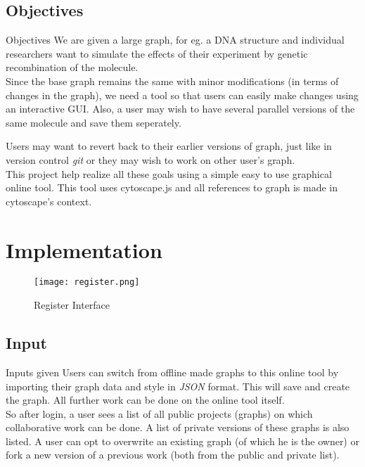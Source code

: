 \documentclass{beamer}
\begin{document}
\subsection{Objectives}
\begin{frame}[allowframebreaks]{Objectives}
We are given a large graph, for eg. a DNA structure and individual researchers want to simulate the effects of their experiment by genetic recombination of the molecule. \\
Since the base graph remains the same with minor modifications (in terms of changes in the graph), we need a tool so that users can easily make changes using an interactive GUI. Also, a user may wish to have several parallel versions of the same molecule and save them seperately. \\
\framebreak

Users may want to revert back to their earlier versions of graph, just like in version control \emph{git} or they may wish to work on other user's graph. \\
This project help realize all these goals using a  simple easy to use graphical online tool. This tool uses cytoscape.js and all references to graph is made in cytoscape's context.
\end{frame}

\section{Implementation}

\begin{frame}
\begin{figure}
\centering
\texttt{[image: register.png]}
\label{fig:register}
\caption{Register Interface}
\end{figure}
\end{frame}

\subsection{Input}
\begin{frame}{Inputs given}
Users can switch from offline made graphs to this online tool by importing their graph data and style in \emph{JSON} format. This will save and create the graph. All further work can be done on the online tool itself.\\
So after login, a user sees a list of all public projects (graphs) on which collaborative work can be done. A list of private versions of these graphs is also listed. A user can opt to overwrite an existing graph (of which he is the owner) or fork a new version of a previous work (both from the public and private list).
\end{frame}
\end{document}
